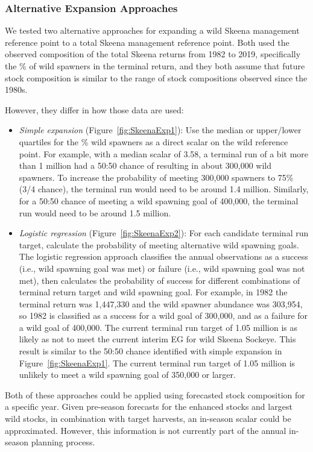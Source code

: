 \documentclass[french,11pt]{book}
\begin{document}
\subsubsection{Alternative Expansion Approaches}\label{alternative-expansion-approaches}

We tested two alternative approaches for expanding a wild Skeena management reference point to a total Skeena management reference point. Both used the observed composition of the total Skeena returns from 1982 to 2019, specifically the \% of wild spawners in the terminal return, and they both assume that future stock composition is similar to the range of stock compositions observed since the 1980s.

However, they differ in how those data are used:
\begin{itemize}

\item
  \emph{Simple expansion} (Figure~\ref{fig:SkeenaExp1}): Use the median or upper/lower quartiles for the \% wild spawners as a direct scalar on the wild reference point. For example, with a median scalar of 3.58, a terminal run of a bit more than 1 million had a 50:50 chance of resulting in about 300,000 wild spawners. To increase the probability of meeting 300,000 spawners to 75\% (3/4 chance), the terminal run would need to be around 1.4 million. Similarly, for a 50:50 chance of meeting a wild spawning goal of 400,000, the terminal run would need to be around 1.5 million.
\item
  \emph{Logistic regression} (Figure~\ref{fig:SkeenaExp2}): For each candidate terminal run target, calculate the probability of meeting alternative wild spawning goals. The logistic regression approach classifies the annual observations as a success (i.e., wild spawning goal was met) or failure (i.e., wild spawning goal was not met), then calculates the probability of success for different combinations of terminal return target and wild spawning goal. For example, in 1982 the terminal return was 1,447,330 and the wild spawner abundance was 303,954, so 1982 is classified as a success for a wild goal of 300,000, and as a failure for a wild goal of 400,000. The current terminal run target of 1.05 million is as likely as not to meet the current interim EG for wild Skeena Sockeye. This result is similar to the 50:50 chance identified with simple expansion in Figure~\ref{fig:SkeenaExp1}. The current terminal run target of 1.05 million is unlikely to meet a wild spawning goal of 350,000 or larger.
\end{itemize}
Both of these approaches could be applied using forecasted stock composition for a specific year. Given pre-season forecasts for the enhanced stocks and largest wild stocks, in combination with target harvests, an in-season scalar could be approximated. However, this information is not currently part of the annual in-season planning process.
\end{document}
